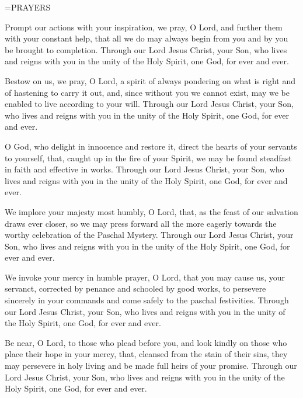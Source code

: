 \hangindent=\parindent \small PRAYERS
\begin{description}[labelindent=\parindent, leftmargin=*]
\item [Thursday after Ash Wednesday:] 	Prompt our actions with your inspiration, we pray, O Lord, and further them with your constant help, that all we do may always begin from you and by you be brought to completion. Through our Lord Jesus Christ, your Son, who lives and reigns with you in the unity of the Holy Spirit, one God, for ever and ever.
\item [Week 1:] 	Bestow on us, we pray, O Lord, a spirit of always pondering on what is right and of hastening to carry it out, and, since without you we cannot exist, may we be enabled to live according to your will. Through our Lord Jesus Christ, your Son, who lives and reigns with you in the unity of the Holy Spirit, one God, for ever and ever.
\item [Week 2:] 	O God, who delight in innocence and restore it, direct the hearts of your servants to yourself, that, caught up in the fire of your Spirit, we may be found steadfast in faith and effective in works. Through our Lord Jesus Christ, your Son, who lives and reigns with you in the unity of the Holy Spirit, one God, for ever and ever.
\item [Week 3:] 	We implore your majesty most humbly, O Lord, that, as the feast of our salvation draws ever closer, so we may press forward all the more eagerly towards the worthy celebration of the Paschal Mystery. Through our Lord Jesus Christ, your Son, who lives and reigns with you in the unity of the Holy Spirit, one God, for ever and ever.
\item [Week 4:] 	We invoke your mercy in humble prayer, O Lord, that you may cause us, your servanct, corrected by penance and schooled by good works, to persevere sincerely in your commands and come safely to the paschal festivities. Through our Lord Jesus Christ, your Son, who lives and reigns with you in the unity of the Holy Spirit, one God, for ever and ever.
\item [Week 5:] 	Be near, O Lord, to those who plead before you, and look kindly on those who place their hope in your mercy, that, cleansed from the stain of their sins, they may persevere in holy living and be made full heirs of your promise. Through our Lord Jesus Christ, your Son, who lives and reigns with you in the unity of the Holy Spirit, one God, for ever and ever.
\end{description}

